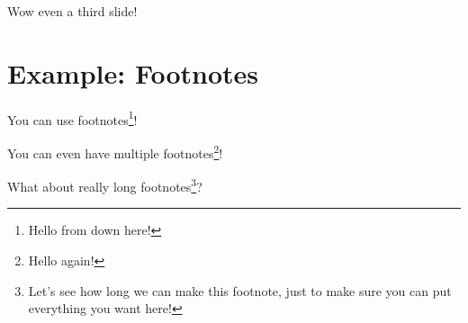 \documentclass[aspectratio=169,17pt]{tuhh_presentation}
\begin{document}
\begin{frame}{Wow even a third slide!}
    \section{Example: Footnotes}

    You can use footnotes\footnote{Hello from down here!}!

    You can even have multiple footnotes\footnote{Hello again!}!

    What about really long footnotes\footnote{Let's see how long we can make this footnote, just to make sure you can put everything you want here!}?

\end{frame}

\finalpage
\end{document}

